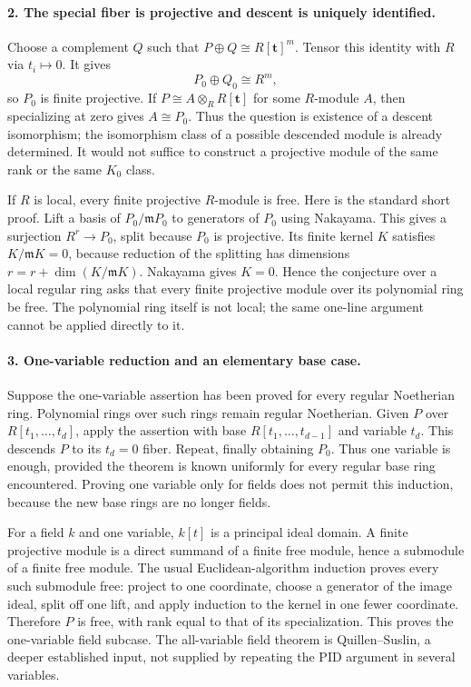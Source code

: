 \documentclass[11pt]{article}
\begin{document}
\paragraph{2. The special fiber is projective and descent is uniquely identified.}
Choose a complement $Q$ such that $P\oplus Q\cong R[\mathbf t]^m$. Tensor this identity with $R$ via $t_i\mapsto0$. It gives
\[
 P_0\oplus Q_0\cong R^m,
\]
so $P_0$ is finite projective. If $P\cong A\otimes_RR[\mathbf t]$ for some $R$-module $A$, then specializing at zero gives $A\cong P_0$. Thus the question is existence of a descent isomorphism; the isomorphism class of a possible descended module is already determined. It would not suffice to construct a projective module of the same rank or the same $K_0$ class.

If $R$ is local, every finite projective $R$-module is free. Here is the standard short proof. Lift a basis of $P_0/\mathfrak mP_0$ to generators of $P_0$ using Nakayama. This gives a surjection $R^r\to P_0$, split because $P_0$ is projective. Its finite kernel $K$ satisfies $K/\mathfrak mK=0$, because reduction of the splitting has dimensions $r=r+\dim(K/\mathfrak mK)$. Nakayama gives $K=0$. Hence the conjecture over a local regular ring asks that every finite projective module over its polynomial ring be free. The polynomial ring itself is not local; the same one-line argument cannot be applied directly to it.

\paragraph{3. One-variable reduction and an elementary base case.}
Suppose the one-variable assertion has been proved for every regular Noetherian ring. Polynomial rings over such rings remain regular Noetherian. Given $P$ over $R[t_1,\ldots,t_d]$, apply the assertion with base $R[t_1,\ldots,t_{d-1}]$ and variable $t_d$. This descends $P$ to its $t_d=0$ fiber. Repeat, finally obtaining $P_0$. Thus one variable is enough, provided the theorem is known uniformly for every regular base ring encountered. Proving one variable only for fields does not permit this induction, because the new base rings are no longer fields.

For a field $k$ and one variable, $k[t]$ is a principal ideal domain. A finite projective module is a direct summand of a finite free module, hence a submodule of a finite free module. The usual Euclidean-algorithm induction proves every such submodule free: project to one coordinate, choose a generator of the image ideal, split off one lift, and apply induction to the kernel in one fewer coordinate. Therefore $P$ is free, with rank equal to that of its specialization. This proves the one-variable field subcase. The all-variable field theorem is Quillen--Suslin, a deeper established input, not supplied by repeating the PID argument in several variables.
\end{document}
